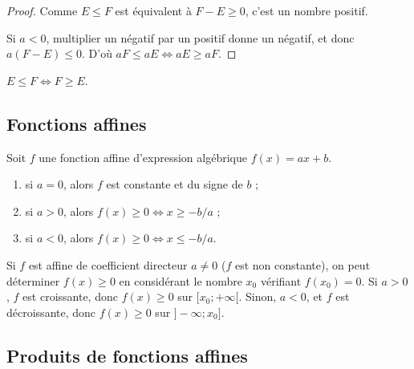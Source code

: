 \documentclass[a4paper, 12pt]{report}
\begin{document}
\begin{proof}
	Comme $E \leq F$ est équivalent à $F - E \geq 0$, c'est un nombre positif.
	
	Si $a < 0$, multiplier un négatif par un positif donne un négatif, et donc $a(F-E) \leq 0$.
	D'où $aF \leq aE \iff aE \geq aF$.
\end{proof}

\begin{rmq}
	$E \leq F \iff F \geq E$.
\end{rmq}

\subsection{Fonctions affines}

\begin{prop}
Soit $f$ une fonction affine d'expression algébrique $f(x)=ax+b$. 
\begin{enumerate}[label=(\roman*)]
\item si $a=0$, alors $f$ est constante et du signe de $b$ ;
\item si $a>0$, alors $f(x) \geq 0 \iff x \geq -b/a$ ;
\item si $a<0$,  alors $f(x) \geq 0 \iff x \leq -b/a$.
\end{enumerate}
\end{prop}

\begin{rmq}
	Si $f$ est affine de coefficient directeur $a\neq0$ ($f$ est non constante), on peut déterminer $f(x) \geq 0$ en considérant le nombre $x_0$ vérifiant $f(x_0)=0$.
	Si $a>0$, $f$ est croissante, donc $f(x) \geq 0$ sur $[x_0 ; +\infty[$.
	Sinon, $a <0$, et $f$ est décroissante, donc $f(x) \geq 0$ sur $]-\infty ; x_0 ]$.
\end{rmq}

\subsection{Produits de fonctions affines}
\end{document}
